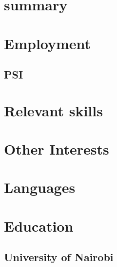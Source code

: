 \documentclass[10pt]{brian_ats}
\begin{document}
\section{summary}
\section{Employment}
\subsection{PSI}
\section{Relevant skills}
\section{Other Interests}
\section{Languages}
\section{Education}
\subsection{University of Nairobi}
\end{document}
